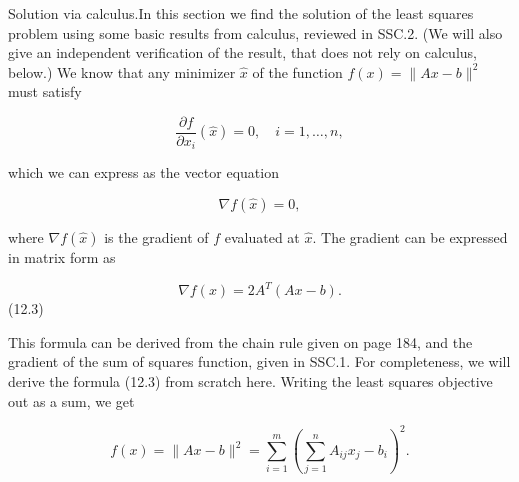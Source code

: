 
Solution via calculus.In this section we find the solution of the least squares problem using some basic results from calculus, reviewed in SSC.2. (We will also give an independent verification of the result, that does not rely on calculus, below.) We know that any minimizer \(\hat{x}\) of the function \(f(x)=\|Ax-b\|^{2}\) must satisfy

\[\frac{\partial f}{\partial x_{i}}(\hat{x})=0,\quad i=1,\ldots,n,\]

which we can express as the vector equation

\[\nabla f(\hat{x})=0,\]

where \(\nabla f(\hat{x})\) is the gradient of \(f\) evaluated at \(\hat{x}\). The gradient can be expressed in matrix form as

\[\nabla f(x)=2A^{T}(Ax-b).\] (12.3)

This formula can be derived from the chain rule given on page 184, and the gradient of the sum of squares function, given in SSC.1. For completeness, we will derive the formula (12.3) from scratch here. Writing the least squares objective out as a sum, we get

\[f(x)=\|Ax-b\|^{2}=\sum_{i=1}^{m}\left(\sum_{j=1}^{n}A_{ij}x_{j}-b_{i}\right)^{ 2}.\] 